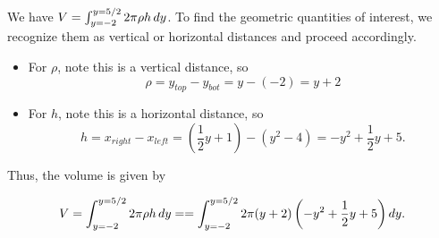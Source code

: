 \documentclass[]{ximera}
\begin{document}
\begin{freeResponse}
\begin{center}
{}
\end{center}

We have $V = \int_{y=-2}^{y=5/2} 2\pi \rho h \mathop{}\!d y$.  To find the geometric quantities of interest, we recognize them as vertical or horizontal distances and proceed accordingly.

\begin{itemize}
\item For $\rho$, note this is a vertical distance, so \[\rho = y_{top}-y_{bot} = y-(-2) = y+2\]
\item For $h$, note this is a horizontal distance, so \[h = x_{right}-x_{left} = \left(\frac{1}{2}y+1\right) - \left(y^2-4\right) = -y^2+
\frac{1}{2} y +5.\]
\end{itemize}

Thus, the volume is given by

\[
V = \int_{y=-2}^{y=5/2} 2\pi \rho h \mathop{}\!d y = = \int_{y=-2}^{y=5/2} 2\pi (y+2)\left(-y^2+\frac{1}{2} y +5 \right) \mathop{}\!d y .
\]
\end{freeResponse}
\end{document}
